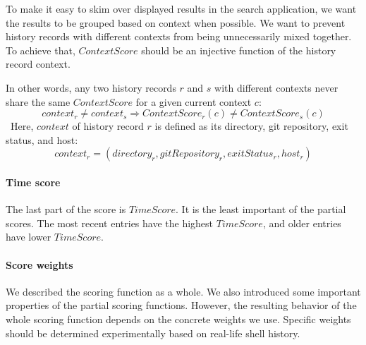 To make it easy to skim over displayed results in the search application, we want the results to be grouped based on context when possible. 
We want to prevent history records with different contexts from being unnecessarily mixed together. 
To achieve that, \(ContextScore\) should be an injective function of the history record context.

In other words, any two history records \(r\) and \(s\) with different contexts never share the same \(ContextScore\) for a given current context \(c\):
\[ context_{r} \neq context_{s} \Rightarrow ContextScore_r(c) \neq ContextScore_s(c) \]\
Here, \(context\) of history record \(r\) is defined as its directory, git repository, exit status, and host:
\[ context_r = (directory_r, gitRepository_r, exitStatus_r, host_r) \]



\paragraph{Time score}

The last part of the score is \(TimeScore\). It is the least important of the partial scores. The most recent entries have the highest \(TimeScore\), and older entries have lower \(TimeScore\). 



\paragraph{Score weights}

We described the scoring function as a whole. We also introduced some important properties of the partial scoring functions. However, the resulting behavior of the whole scoring function depends on the concrete weights we use. 
Specific weights should be determined experimentally based on real-life shell history.







